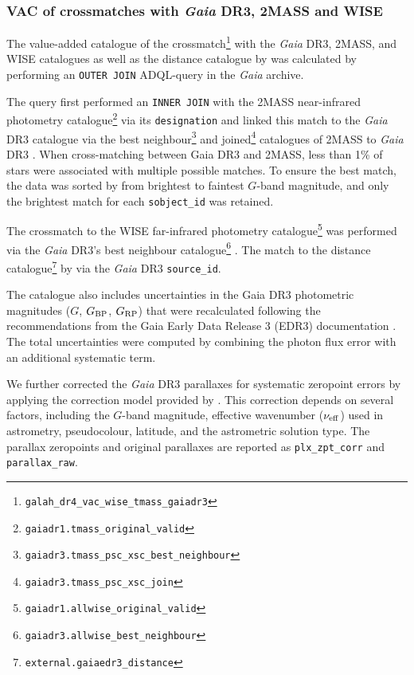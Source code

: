 \documentclass[
  journal=pasa,
  manuscript=research-paper, %
  year=2024,
  volume=37
]{cup-journal}
\newcommand{\Gaia}{\textit{Gaia}\xspace}
\begin{document}
\subsubsection{VAC of crossmatches with \Gaia DR3, 2MASS and WISE} \label{sec:vac_crossmatch}

The value-added catalogue of the crossmatch\footnote{\texttt{galah\_dr4\_vac\_wise\_tmass\_gaiadr3}} with the \Gaia DR3, 2MASS, and WISE catalogues as well as the distance catalogue by \citet{BailerJones2021} was calculated by performing an \texttt{OUTER JOIN} ADQL-query in the \Gaia archive. 

The query first performed an \texttt{INNER JOIN} with the 2MASS near-infrared photometry catalogue\footnote{\texttt{gaiadr1.tmass\_original\_valid}} \citep{Skrutskie2006} via its \texttt{designation} and linked this match to the \Gaia DR3 catalogue via the best neighbour\footnote{ \texttt{gaiadr3.tmass\_psc\_xsc\_best\_neighbour}} and joined\footnote{\texttt{gaiadr3.tmass\_psc\_xsc\_join}} catalogues of 2MASS to \Gaia DR3 \citep{Torra2021}. When cross-matching between Gaia DR3 and 2MASS, less than 1\% of stars were associated with multiple possible matches. To ensure the best match, the data was sorted by from brightest to faintest \(G\)-band magnitude, and only the brightest match for each \texttt{sobject\_id} was retained.

The crossmatch to the WISE far-infrared photometry catalogue\footnote{\texttt{gaiadr1.allwise\_original\_valid}} \citep{Cutri2013} was performed via the \Gaia DR3's best neighbour catalogue\footnote{\texttt{gaiadr3.allwise\_best\_neighbour}} \citep{Torra2021}. The match to the distance catalogue\footnote{\texttt{external.gaiaedr3\_distance}} by \citet{BailerJones2021}  via the \Gaia DR3 \texttt{source\_id}.

The catalogue also includes uncertainties in the Gaia DR3 photometric magnitudes (\(G\), \(G_{\rm BP}\), \(G_{\rm RP}\)) that were recalculated following the recommendations from the Gaia Early Data Release 3 (EDR3) documentation \citep{Riello2021}. The total uncertainties were computed by combining the photon flux error with an additional systematic term.

We further corrected the \Gaia DR3 parallaxes for systematic zeropoint errors by applying the correction model provided by \citet{Lindegren2021b}. This correction depends on several factors, including the \(G\)-band magnitude, effective wavenumber (\(\nu_{\rm eff}\)) used in astrometry, pseudocolour, latitude, and the astrometric solution type. The parallax zeropoints and original parallaxes are reported as \texttt{plx\_zpt\_corr} and \texttt{parallax\_raw}.
\end{document}
